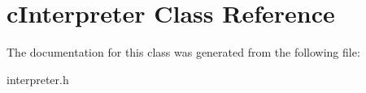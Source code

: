 \hypertarget{classcInterpreter}{
\section{c\-Interpreter \-Class \-Reference}
\label{classcInterpreter}
}


\-The documentation for this class was generated from the following file\-:\begin{DoxyCompactItemize}
\item 
interpreter.\-h\end{DoxyCompactItemize}
